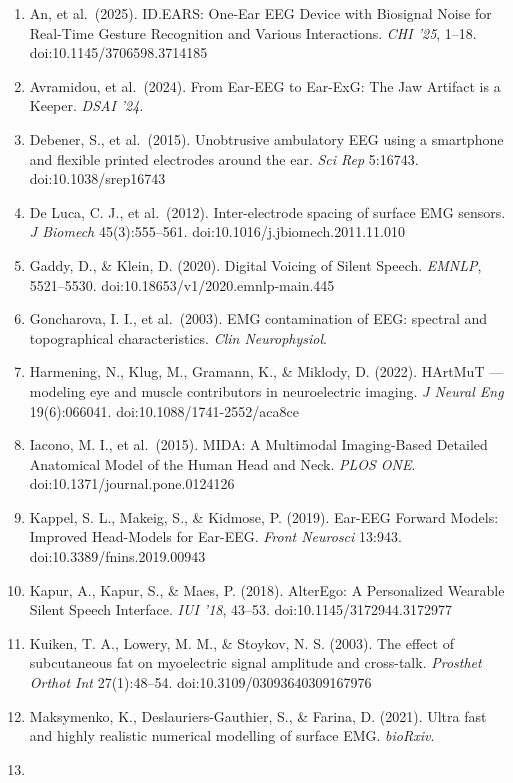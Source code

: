 \documentclass[
  11pt,
  letterpaper,
]{article}
\providecommand{\tightlist}{%
  \setlength{\itemsep}{0pt}\setlength{\parskip}{0pt}}
\providecommand{\tightlist}{%
  \setlength{\itemsep}{0pt}\setlength{\parskip}{0pt}}
\begin{document}
\begin{enumerate}
\def\labelenumi{\arabic{enumi}.}
\tightlist
\item
  An, et al.~(2025). ID.EARS: One-Ear EEG Device with Biosignal Noise for Real-Time Gesture Recognition and Various Interactions. \emph{CHI '25}, 1--18. doi:10.1145/3706598.3714185
\item
  Avramidou, et al.~(2024). From Ear-EEG to Ear-ExG: The Jaw Artifact is a Keeper. \emph{DSAI '24}.
\item
  Debener, S., et al.~(2015). Unobtrusive ambulatory EEG using a smartphone and flexible printed electrodes around the ear. \emph{Sci Rep} 5:16743. doi:10.1038/srep16743
\item
  De Luca, C. J., et al.~(2012). Inter-electrode spacing of surface EMG sensors. \emph{J Biomech} 45(3):555--561. doi:10.1016/j.jbiomech.2011.11.010
\item
  Gaddy, D., \& Klein, D. (2020). Digital Voicing of Silent Speech. \emph{EMNLP}, 5521--5530. doi:10.18653/v1/2020.emnlp-main.445
\item
  Goncharova, I. I., et al.~(2003). EMG contamination of EEG: spectral and topographical characteristics. \emph{Clin Neurophysiol}.
\item
  Harmening, N., Klug, M., Gramann, K., \& Miklody, D. (2022). HArtMuT --- modeling eye and muscle contributors in neuroelectric imaging. \emph{J Neural Eng} 19(6):066041. doi:10.1088/1741-2552/aca8ce
\item
  Iacono, M. I., et al.~(2015). MIDA: A Multimodal Imaging-Based Detailed Anatomical Model of the Human Head and Neck. \emph{PLOS ONE}. doi:10.1371/journal.pone.0124126
\item
  Kappel, S. L., Makeig, S., \& Kidmose, P. (2019). Ear-EEG Forward Models: Improved Head-Models for Ear-EEG. \emph{Front Neurosci} 13:943. doi:10.3389/fnins.2019.00943
\item
  Kapur, A., Kapur, S., \& Maes, P. (2018). AlterEgo: A Personalized Wearable Silent Speech Interface. \emph{IUI '18}, 43--53. doi:10.1145/3172944.3172977
\item
  Kuiken, T. A., Lowery, M. M., \& Stoykov, N. S. (2003). The effect of subcutaneous fat on myoelectric signal amplitude and cross-talk. \emph{Prosthet Orthot Int} 27(1):48--54. doi:10.3109/03093640309167976
\item
  Maksymenko, K., Deslauriers-Gauthier, S., \& Farina, D. (2021). Ultra fast and highly realistic numerical modelling of surface EMG. \emph{bioRxiv}.
\item

\end{enumerate}
\end{document}
